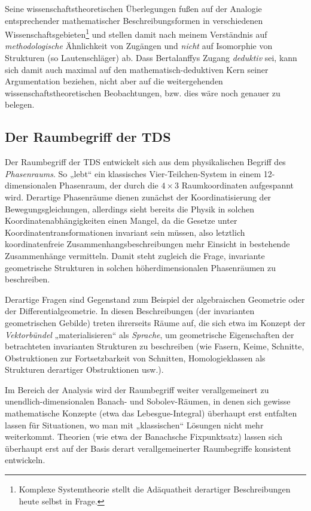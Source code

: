 \documentclass[11pt,a4paper]{article}
\begin{document}
Seine wissenschaftstheoretischen Überlegungen fußen auf der Analogie
entsprechender mathematischer Beschreibungsformen in verschiedenen
Wissenschaftsgebieten\footnote{Komplexe Systemtheorie stellt die Adäquatheit
  derartiger Beschreibungen heute selbst in Frage.} und stellen damit nach
meinem Verständnis auf \emph{methodologische} Ähnlichkeit von Zugängen und
\emph{nicht} auf Isomorphie von Strukturen (so Lautenschläger) ab. Dass
Bertalanffys Zugang \emph{deduktiv} sei, kann sich damit auch maximal auf den
mathematisch-deduktiven Kern seiner Argumentation beziehen, nicht aber auf die
weitergehenden wissenschaftstheoretischen Beobachtungen, bzw. dies wäre noch
genauer zu belegen.

\subsection{Der Raumbegriff der TDS}

Der Raumbegriff der TDS entwickelt sich aus dem physikalischen Begriff des
\emph{Phasenraums}. So „lebt“ ein klassisches Vier-Teilchen-System in einem
12-dimensionalen Phasenraum, der durch die $4\times 3$ Raumkoordinaten
aufgespannt wird. Derartige Phasenräume dienen zunächst der Koordinatisierung
der Bewegungsgleichungen, allerdings sieht bereits die Physik in solchen
Koordinatenabhängigkeiten einen Mangel, da die Gesetze unter
Koordinatentransformationen invariant sein müssen, also letztlich
koordinatenfreie Zusammenhangsbeschreibungen mehr Einsicht in bestehende
Zusammenhänge vermitteln. Damit steht zugleich die Frage, invariante
geometrische Strukturen in solchen höherdimensionalen Phasenräumen zu
beschreiben.

Derartige Fragen sind Gegenstand zum Beispiel der algebraischen Geometrie oder
der Differentialgeometrie. In diesen Beschreibungen (der invarianten
geometrischen Gebilde) treten ihrerseits Räume auf, die sich etwa im Konzept
der \emph{Vektorbündel} „materialisieren“ als \emph{Sprache}, um geometrische
Eigenschaften der betrachteten invarianten Strukturen zu beschreiben (wie
Fasern, Keime, Schnitte, Obstruktionen zur Fortsetzbarkeit von Schnitten,
Homologieklassen als Strukturen derartiger Obstruktionen usw.).

Im Bereich der Analysis wird der Raumbegriff weiter verallgemeinert zu
unendlich-dimensio\-nalen Banach- und Sobolev-Räumen, in denen sich gewisse
mathematische Konzepte (etwa das Lebesgue-Integral) überhaupt erst entfalten
lassen für Situationen, wo man mit „klassischen“ Lösungen nicht mehr
weiterkommt.  Theorien (wie etwa der Banachsche Fixpunktsatz) lassen sich
überhaupt erst auf der Basis derart verallgemeinerter Raumbegriffe konsistent
entwickeln.
\end{document}
